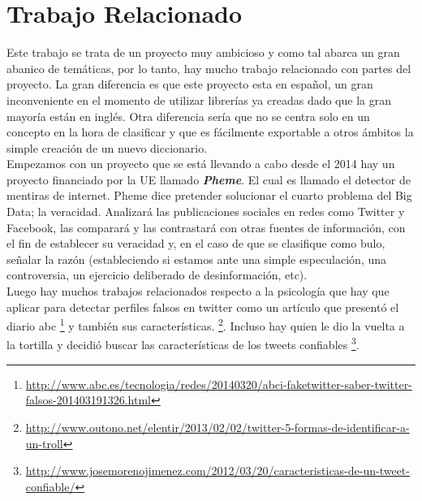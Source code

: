 \documentclass[../all.tex]{subfiles}
\begin{document}
\section{Trabajo Relacionado} %
    
    Este trabajo se trata de un proyecto muy ambicioso y como tal abarca un gran abanico de temáticas, por lo tanto, hay mucho trabajo relacionado con partes del proyecto. La gran diferencia es que este proyecto esta en español, un gran inconveniente en el momento de utilizar librerías ya creadas dado que la gran mayoría están en inglés. Otra diferencia sería que no se centra solo en un concepto en la hora de clasificar y que es fácilmente exportable a otros ámbitos la simple creación de un nuevo diccionario.\\
    
    Empezamos con un proyecto que se está llevando a cabo desde el 2014 hay un proyecto financiado por la UE llamado \textbf{\textit{Pheme}}. El cual es llamado el detector de mentiras de internet. Pheme dice pretender solucionar el cuarto problema del Big Data; la veracidad. Analizará las publicaciones sociales en redes como Twitter y Facebook, las comparará y las contrastará con otras fuentes de información, con el fin de establecer su veracidad y, en el caso de que se clasifique como bulo, señalar la razón (estableciendo si estamos ante una simple especulación, una controversia, un ejercicio deliberado de desinformación, etc).\\

    Luego hay muchos trabajos relacionados respecto a la psicología que hay que aplicar para detectar perfiles falsos en twitter como un artículo que presentó el diario abc 
    \footnote{\tiny\url{http://www.abc.es/tecnologia/redes/20140320/abci-faketwitter-saber-twitter-falsos-201403191326.html}} y también sus características.
    \footnote{\tiny\url{http://www.outono.net/elentir/2013/02/02/twitter-5-formas-de-identificar-a-un-troll}}. Incluso hay quien le dio la vuelta a la tortilla y decidió buscar las características de los tweets confiables \footnote{\tiny\url{http://www.josemorenojimenez.com/2012/03/20/caracteristicas-de-un-tweet-confiable/}}.\\
\end{document}

